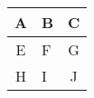 \documentclass[11pt]{revtex4-1}
\begin{document}
\begin{center}
  \begin{tabular}{c|p{3em}|c}
    A & B & C \\ \hline
    E & F & G \\
    H & I & J
  \end{tabular}
\end{center}
\end{document}
